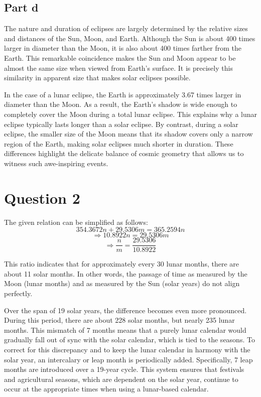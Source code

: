 \documentclass{article}
\begin{document}
\subsection*{Part d}
The nature and duration of eclipses are largely determined by the relative sizes and distances of the Sun, Moon, and Earth. Although the Sun is about 400 times larger in diameter than the Moon, it is also about 400 times farther from the Earth. This remarkable coincidence makes the Sun and Moon appear to be almost the same size when viewed from Earth’s surface. It is precisely this similarity in apparent size that makes solar eclipses possible.  

In the case of a lunar eclipse, the Earth is approximately 3.67 times larger in diameter than the Moon. As a result, the Earth’s shadow is wide enough to completely cover the Moon during a total lunar eclipse. This explains why a lunar eclipse typically lasts longer than a solar eclipse. By contrast, during a solar eclipse, the smaller size of the Moon means that its shadow covers only a narrow region of the Earth, making solar eclipses much shorter in duration. These differences highlight the delicate balance of cosmic geometry that allows us to witness such awe-inspiring events.

\section*{Question 2}
The given relation can be simplified as follows:
\[
354.3672n + 29.5306m = 365.2594n
\]
\[
\Rightarrow 10.8922n = 29.5306m
\]
\[
\Rightarrow \frac{n}{m} = \frac{29.5306}{10.8922}
\]

This ratio indicates that for approximately every 30 lunar months, there are about 11 solar months. In other words, the passage of time as measured by the Moon (lunar months) and as measured by the Sun (solar years) do not align perfectly.  

Over the span of 19 solar years, the difference becomes even more pronounced. During this period, there are about 228 solar months, but nearly 235 lunar months. This mismatch of 7 months means that a purely lunar calendar would gradually fall out of sync with the solar calendar, which is tied to the seasons. To correct for this discrepancy and to keep the lunar calendar in harmony with the solar year, an intercalary or leap month is periodically added. Specifically, 7 leap months are introduced over a 19-year cycle. This system ensures that festivals and agricultural seasons, which are dependent on the solar year, continue to occur at the appropriate times when using a lunar-based calendar.
\end{document}

